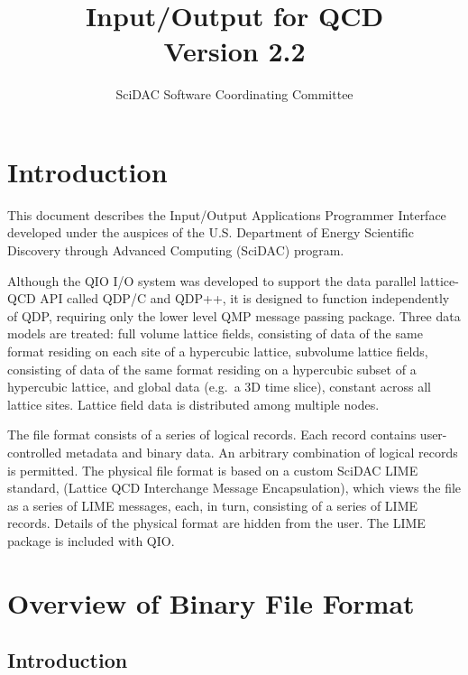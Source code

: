 \documentclass{article}
\begin{document}
\title{
   Input/Output for QCD \\{\large Version 2.2}
}
\author{ SciDAC Software Coordinating Committee}

\maketitle
\section{Introduction}
This document describes the Input/Output Applications Programmer
Interface developed under the auspices of the U.S. Department of
Energy Scientific Discovery through Advanced Computing (SciDAC)
program.

Although the QIO I/O system was developed to support the data parallel
lattice-QCD API called QDP/C and QDP++, it is designed to function
independently of QDP, requiring only the lower level QMP message
passing package.  Three data models are treated: full volume lattice
fields, consisting of data of the same format residing on each site of
a hypercubic lattice, subvolume lattice fields, consisting of data of
the same format residing on a hypercubic subset of a hypercubic
lattice, and global data (e.g.\ a 3D time slice), constant across all
lattice sites.  Lattice field data is distributed among multiple
nodes.

The file format consists of a series of logical records.  Each record
contains user-controlled metadata and binary data.  An arbitrary
combination of logical records is permitted.  The physical file format
is based on a custom SciDAC LIME standard, (Lattice QCD Interchange
Message Encapsulation), which views the file as a series of LIME
messages, each, in turn, consisting of a series of LIME records.
Details of the physical format are hidden from the user.  The LIME
package is included with QIO.

\section{Overview of Binary File Format}
\label{sec.fileformat}

\subsection{Introduction}
\end{document}
